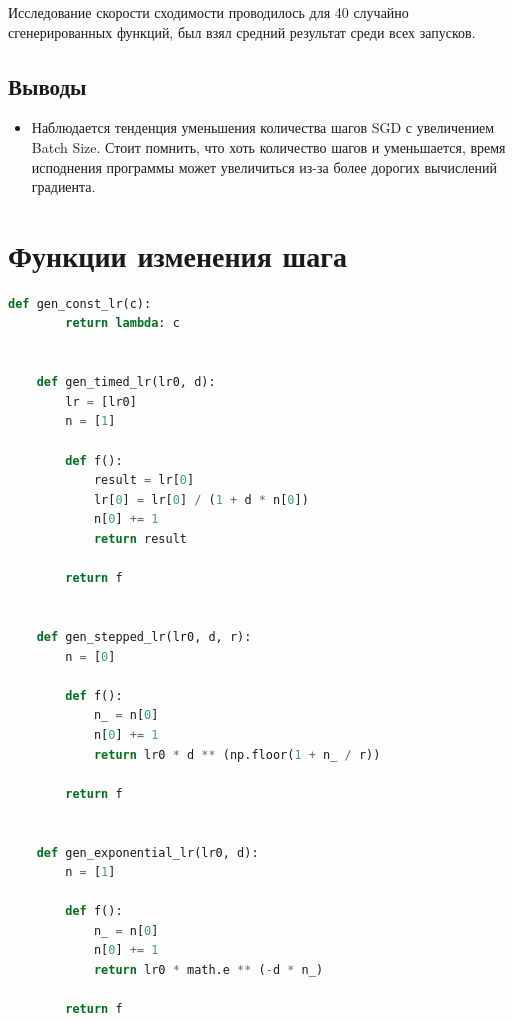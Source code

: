 \documentclass[a4paper,14pt,oneside,openany]{memoir}
\begin{document}
Исследование скорости сходимости проводилось для 40 случайно сгенерированных функций, был взял средний результат среди всех запусков.

\subsection{Выводы}

\begin{itemize}
\item Наблюдается тенденция уменьшения количества шагов SGD с увеличением Batch Size. Стоит помнить, что хоть количество шагов и уменьшается, время исподнения программы может увеличиться из-за более дорогих вычислений градиента.
\end{itemize}

\newpage

\section{Функции изменения шага}



\begin{lstlisting}[language=Python, caption=Реализации функций изменения шага]
	def gen_const_lr(c):
	    return lambda: c
	
	
	def gen_timed_lr(lr0, d):
	    lr = [lr0]
	    n = [1]
	
	    def f():
	        result = lr[0]
	        lr[0] = lr[0] / (1 + d * n[0])
	        n[0] += 1
	        return result
	
	    return f
	
	
	def gen_stepped_lr(lr0, d, r):
	    n = [0]
	
	    def f():
	        n_ = n[0]
	        n[0] += 1
	        return lr0 * d ** (np.floor(1 + n_ / r))
	
	    return f
	
	
	def gen_exponential_lr(lr0, d):
	    n = [1]
	
	    def f():
	        n_ = n[0]
	        n[0] += 1
	        return lr0 * math.e ** (-d * n_)
	
	    return f
\end{lstlisting}
\end{document}
